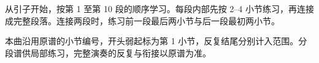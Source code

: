 从引子开始，按第 1 至第 10 段的顺序学习。每段内部先按 2--4 小节练习，再连接成完整段落。连接两段时，练习前一段最后两小节与后一段最初两小节。

本曲沿用原谱的小节编号，开头弱起标为第 1 小节，反复结尾分别计入范围。分段谱供局部练习，完整演奏的反复与衔接以原谱为准。
